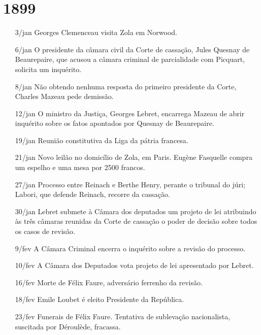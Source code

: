 \section{1899}
\begin{itemize}
\setlength\itemsep{-1mm}
\item[3/jan] Georges Clemenceau visita Zola em Norwood.

\item[6/jan] O presidente da câmara civil da Corte de cassação, Jules Quesnay
de Beaurepaire, que acusou a câmara criminal de parcialidade com Picquart,
solicita um inquérito.

\item[8/jan] Não obtendo nenhuma resposta do primeiro presidente da Corte,
Charles Mazeau pede demissão.

\item[12/jan] O ministro da Justiça, Georges Lebret, encarrega Mazeau de abrir
inquérito sobre os fatos apontados por Quesnay de Beaurepaire.

\item[19/jan] Reunião constitutiva da Liga da pátria francesa.

\item[21/jan] Novo leilão no domicílio de Zola, em Paris. Eugène Fasquelle
compra um espelho e uma mesa por 2500 francos.

\item[27/jan] Processo entre Reinach e Berthe Henry, perante o tribunal do
júri; Labori, que defende Reinach, recorre da cassação.

\item[30/jan] Lebret submete à Câmara dos deputados um projeto de lei
atribuindo às três câmaras reunidas da Corte de cassação o poder de decisão
sobre todos os casos de revisão.

\item[9/fev]  A Câmara Criminal encerra o inquérito sobre a revisão do
processo.

\item[10/fev] A Câmara dos Deputados vota projeto de lei apresentado por
Lebret.

\item[16/fev] Morte de Félix Faure, adversário ferrenho da revisão.

\item[18/fev] Emile Loubet é eleito Presidente da República.

\item[23/fev] Funerais de Félix Faure. Tentativa de sublevação nacionalista,
suscitada por Déroulède, fracassa.


\end{itemize}
